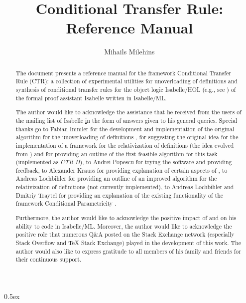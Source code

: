 \documentclass[11pt,a4paper]{article}
\begin{document}
\sloppy

\title{Conditional Transfer Rule: Reference Manual} 
\author{Mihails Milehins}
\maketitle

\newpage

\begin{abstract}
The document presents a reference manual for the framework 
Conditional Transfer Rule (CTR): a collection of experimental utilities 
for unoverloading of definitions and synthesis of conditional transfer rules
for the object logic Isabelle/HOL (e.g., see \cite{yang_comprehending_2017}) 
of the formal proof assistant Isabelle \cite{paulson_natural_1986} written 
in Isabelle/ML. 
\end{abstract}

\newpage

\renewcommand{\abstractname}{Acknowledgements}
\begin{abstract}

The author would like to acknowledge the assistance that he received from 
the users of the mailing list of Isabelle 
\href{https://lists.cam.ac.uk/mailman/listinfo/cl-isabelle-users}
in the form of answers given to his general queries. 
Special thanks go to Fabian Immler for the development and implementation 
of the original algorithm for the unoverloading of definitions 
\cite{immler_automation_2019}, for suggesting the original idea for 
the implementation of a framework for the relativization of definitions
(the idea evolved from \cite{immler_smooth_2019}) and for providing 
an outline of the first feasible algorithm for this task (implemented as 
\textit{CTR II}), to Andrei Popescu for trying the software and providing feedback, 
to Alexander Krauss for providing explanation of certain aspects of 
\cite{kaufmann_mechanized_2010}, 
to Andreas Lochbihler for providing an outline 
of an improved algorithm for the relativization of definitions 
(not currently implemented), to Andreas Lochbihler and Dmitriy Traytel 
for providing an explanation of the existing functionality of the framework 
Conditional Parametricity \cite{gilcher_conditional_2017}.   

Furthermore, the author would like to acknowledge the positive 
impact of \cite{urban_isabelle_2019} and 
\cite{wenzel_isabelle/isar_2019} on his ability to code in Isabelle/ML.
Moreover, the author would like to acknowledge
the positive role that numerous Q\&A posted on the Stack Exchange network 
(especially Stack Overflow and TeX Stack Exchange) played in the 
development of this work. 
The author would also like to express gratitude to all members of his family 
and friends for their continuous support.

\end{abstract}

\newpage

\tableofcontents

\newpage

\parindent 0pt\parskip 0.5ex



\newpage


\end{document}
